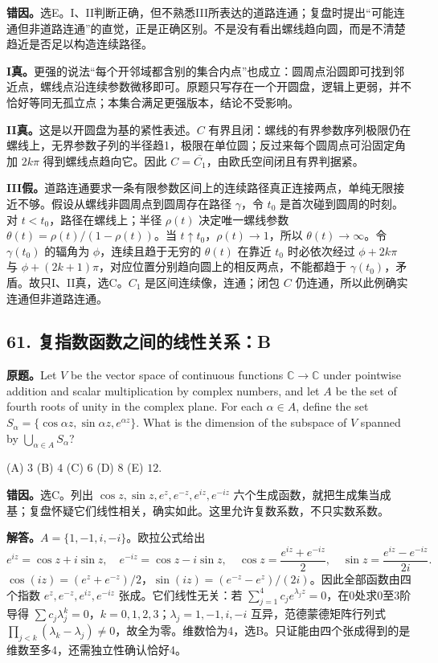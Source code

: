 \documentclass[11pt,a4paper,fontset=fandol]{ctexart}
\begin{document}
\textbf{错因。}选E。I、II判断正确，但不熟悉III所表达的道路连通；复盘时提出“可能连通但非道路连通”的直觉，正是正确区别。不是没有看出螺线趋向圆，而是不清楚趋近是否足以构造连续路径。

\textbf{I真。}更强的说法“每个开邻域都含别的集合内点”也成立：圆周点沿圆即可找到邻近点，螺线点沿连续参数微移即可。原题只写存在一个开圆盘，逻辑上更弱，并不恰好等同无孤立点；本集合满足更强版本，结论不受影响。

\textbf{II真。}这是以开圆盘为基的紧性表述。$C$ 有界且闭：螺线的有界参数序列极限仍在螺线上，无界参数子列的半径趋1，极限在单位圆；反过来每个圆周点可沿固定角加 $2k\pi$ 得到螺线点趋向它。因此 $C=\overline{C_1}$，由欧氏空间闭且有界判据紧。

\textbf{III假。}道路连通要求一条有限参数区间上的连续路径真正连接两点，单纯无限接近不够。假设从螺线非圆周点到圆周存在路径 $\gamma$，令 $t_0$ 是首次碰到圆周的时刻。对 $t<t_0$，路径在螺线上；半径 $\rho(t)$ 决定唯一螺线参数 $\theta(t)=\rho(t)/(1-\rho(t))$。当 $t\uparrow t_0$，$\rho(t)\to1$，所以 $\theta(t)\to\infty$。令 $\gamma(t_0)$ 的辐角为 $\phi$，连续且趋于无穷的 $\theta(t)$ 在靠近 $t_0$ 时必依次经过 $\phi+2k\pi$ 与 $\phi+(2k+1)\pi$，对应位置分别趋向圆上的相反两点，不能都趋于 $\gamma(t_0)$，矛盾。故只I、II真，选C。$C_1$ 是区间连续像，连通；闭包 $C$ 仍连通，所以此例确实连通但非道路连通。

\subsection{61. 复指数函数之间的线性关系：B}
\label{ms:q61}
\textbf{原题。}Let $V$ be the vector space of continuous functions $\mathbb C\to\mathbb C$ under pointwise addition and scalar multiplication by complex numbers, and let $A$ be the set of fourth roots of unity in the complex plane. For each $\alpha\in A$, define the set $S_\alpha=\{\cos\alpha z,\sin\alpha z,e^{\alpha z}\}$. What is the dimension of the subspace of $V$ spanned by $\bigcup_{\alpha\in A}S_\alpha$?

(A) $3$ \quad (B) $4$ \quad (C) $6$ \quad (D) $8$ \quad (E) $12$.

\textbf{错因。}选C。列出 $\cos z,\sin z,e^z,e^{-z},e^{iz},e^{-iz}$ 六个生成函数，就把生成集当成基；复盘怀疑它们线性相关，确实如此。这里允许复数系数，不只实数系数。

\textbf{解答。}$A=\{1,-1,i,-i\}$。欧拉公式给出
\[
e^{iz}=\cos z+i\sin z,\quad e^{-iz}=\cos z-i\sin z,\quad
\cos z=\frac{e^{iz}+e^{-iz}}2,\quad
\sin z=\frac{e^{iz}-e^{-iz}}{2i}.
\]
$\cos(iz)=(e^z+e^{-z})/2$，$\sin(iz)=(e^{-z}-e^z)/(2i)$。因此全部函数由四个指数 $e^z,e^{-z},e^{iz},e^{-iz}$ 张成。它们线性无关：若 $\sum_{j=1}^4 c_je^{\lambda_jz}=0$，在0处求0至3阶导得 $\sum c_j\lambda_j^k=0$，$k=0,1,2,3$；$\lambda_j=1,-1,i,-i$ 互异，范德蒙德矩阵行列式 $\prod_{j<k}(\lambda_k-\lambda_j)\ne0$，故全为零。维数恰为4，选B。只证能由四个张成得到的是维数至多4，还需独立性确认恰好4。
\end{document}
